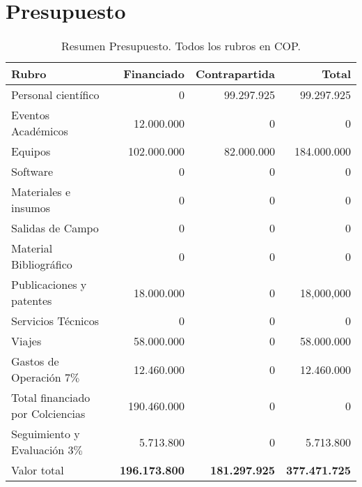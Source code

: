 
\section{Presupuesto}




\begin{table}[h]
\begin{center}
\begin{tabular}{|l|r|r|r|}\hline
\textbf{Rubro} 	& {\bf Financiado} & {\bf Contrapartida} & {\bf Total}\\\hline 
Personal científico	&0	&99.297.925	&99.297.925\\\hline
Eventos Académicos	&12.000.000	& 0	& 0\\\hline
Equipos	& 102.000.000 &	82.000.000 &	184.000.000\\\hline
Software&	0	&0	&0\\\hline
Materiales e insumos	&0	&0	&0\\\hline
Salidas de Campo	&0	&0	&0\\\hline
Material Bibliogr\'afico	&0	&0	&0 \\\hline
Publicaciones y patentes&	18.000.000	&0	&18,000,000\\\hline
Servicios Técnicos	&0	&0	&0\\\hline
Viajes	& 58.000.000	& 0	&58.000.000\\\hline
Gastos de Operación $7\%$&	12.460.000	&0	&12.460.000\\\hline
Total financiado por Colciencias&	190.460.000	&0	&0\\\hline
Seguimiento y Evaluación $3\%$&	 5.713.800	&0	&5.713.800\\\hline
Valor total&	{\bf 196.173.800}	& {\bf 181.297.925}	&{\bf 377.471.725}\\\hline
\end{tabular} 
\caption{Resumen Presupuesto. Todos los rubros en COP.}
\end{center}
\label{Resumen Presupuesto}
\end{table}


